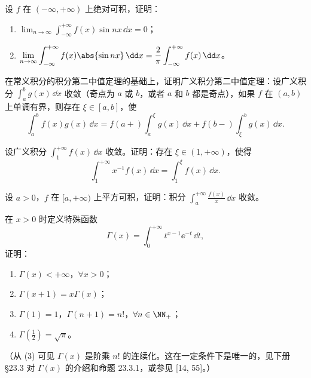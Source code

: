 \begin{xreferenceproblem}[12]
设 $f$ 在 $(-\infty,+\infty)$ 上绝对可积，证明：
  \begin{enumerate}[label=(\arabic*)]
    \item $\displaystyle\lim_{n\to\infty}\int_{-\infty}^{+\infty}f(x)\sin nx\,\dd x=0$；
    \item $\displaystyle\lim_{n\to\infty}\int_{-\infty}^{+\infty}f(x)\abs{\sin nx}\,\dd x=\frac2\pi\int_{-\infty}^{+\infty}f(x)\,\dd x$。
  \end{enumerate}
\end{xreferenceproblem}

\begin{xreferenceproblem}[13]
在常义积分的积分第二中值定理的基础上，证明广义积分第二中值定理：设广义积分 $\int_a^b g(x)\,\dd x$ 收敛（奇点为 $a$ 或 $b$，或者 $a$ 和 $b$ 都是奇点），如果 $f$ 在 $(a,b)$ 上单调有界，则存在 $\xi\in[a,b]$，使
  \[
    \int_a^b f(x)g(x)\,\dd x
    =f(a+)\int_a^\xi g(x)\,\dd x+f(b-)\int_\xi^b g(x)\,\dd x.
  \]
\end{xreferenceproblem}

\begin{xreferenceproblem}[14]
设广义积分 $\int_1^{+\infty}f(x)\,\dd x$ 收敛。证明：存在 $\xi\in(1,+\infty)$，使得
  \[
    \int_1^{+\infty}x^{-1}f(x)\,\dd x=\int_1^\xi f(x)\,\dd x.
  \]
\end{xreferenceproblem}

\begin{xreferenceproblem}[15]
设 $a>0$，$f$ 在 $[a,+\infty)$ 上平方可积，证明：积分 $\int_a^{+\infty}\frac{f(x)}x\,\dd x$ 收敛。
\end{xreferenceproblem}

\begin{xreferenceproblem}[16]
在 $x>0$ 时定义特殊函数
  \[
    \Gamma(x)=\int_0^{+\infty}t^{x-1}\ee^{-t}\,\dd t,
  \]
  证明：
  \begin{enumerate}[label=(\arabic*)]
    \item $\Gamma(x)<+\infty$，$\forall x>0$；
    \item $\Gamma(x+1)=x\Gamma(x)$；
    \item $\Gamma(1)=1$，$\Gamma(n+1)=n!$，$\forall n\in\NN_+$；
    \item $\Gamma\left(\frac12\right)=\sqrt\pi$。
  \end{enumerate}
\end{xreferenceproblem}

（从 (3) 可见 $\Gamma(x)$ 是阶乘 $n!$ 的连续化。这在一定条件下是唯一的，见下册 §23.3 对 $\Gamma(x)$ 的介绍和命题 23.3.1，或参见 [14, 55]。）

